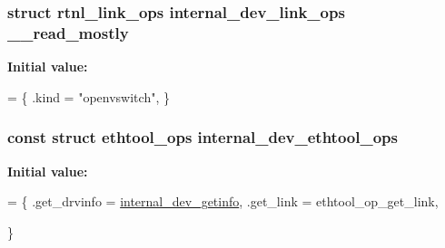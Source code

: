 \subsubsection[{\+\_\+\+\_\+read\+\_\+mostly}]{\setlength{\rightskip}{0pt plus 5cm}struct rtnl\+\_\+link\+\_\+ops internal\+\_\+dev\+\_\+link\+\_\+ops \+\_\+\+\_\+read\+\_\+mostly\hspace{0.3cm}{\ttfamily [static]}}\label{linux_2vport-internal__dev_8c_a8e42f895d19142ac43bdcfedf9271120}
{\bfseries Initial value\+:}
\begin{DoxyCode}
= \{
    .kind = \textcolor{stringliteral}{"openvswitch"},
\}
\end{DoxyCode}
\hypertarget{linux_2vport-internal__dev_8c_aa2c816d0e5a964778079cefc6d9f2c13}{}
\subsubsection[{internal\+\_\+dev\+\_\+ethtool\+\_\+ops}]{\setlength{\rightskip}{0pt plus 5cm}const struct ethtool\+\_\+ops internal\+\_\+dev\+\_\+ethtool\+\_\+ops\hspace{0.3cm}{\ttfamily [static]}}\label{linux_2vport-internal__dev_8c_aa2c816d0e5a964778079cefc6d9f2c13}
{\bfseries Initial value\+:}
\begin{DoxyCode}
= \{
    .get\_drvinfo    = \hyperlink{linux_2vport-internal__dev_8c_a2b613f99606cc15239007e60575ee5f5}{internal\_dev\_getinfo},
    .get\_link   = ethtool\_op\_get\_link,








\}
\end{DoxyCode}
\hypertarget{linux_2vport-internal__dev_8c_af6e4b8260f029c8e987281b6e9890b8e}{}
